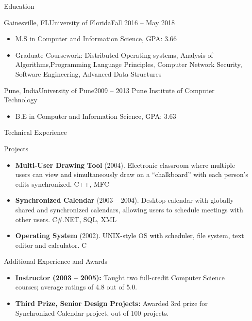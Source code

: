 \documentclass[]{mcdowellcv}
\begin{document}
	\begin{cvsection}{Education}
		\begin{cvsubsection}{Gainesville, FL}{University of Florida}{Fall 2016 -- May 2018}
			\begin{itemize}
				\item M.S in Computer and Information Science,  GPA: 3.66
				\item  Graduate Coursework: Distributed Operating systems, Analysis of Algorithms,Programming Language Principles, Computer Network
			Security, Software Engineering, Advanced Data Structures
			
		\end{itemize}
		\end{cvsubsection}
		\begin{cvsubsection}{Pune, India}{University of Pune}{2009 -- 2013}
			Pune Institute of Computer Technology	
		\begin{itemize}
				\item B.E in Computer and Information Science,  GPA: 3.63
		\end{itemize}
		\end{cvsubsection}

	\end{cvsection}
	
	\begin{cvsection}{Technical Experience}
		\begin{cvsubsection}{Projects}{}{}
			\begin{itemize}
				\item \textbf{Multi-User Drawing Tool} (2004). Electronic classroom where multiple users can view and simultaneously draw on a “chalkboard” with each person’s edits synchronized.  C++, MFC
				\item \textbf{Synchronized Calendar} (2003 – 2004). Desktop calendar with globally shared and synchronized calendars, allowing users to schedule meetings with other users.  C\#.NET, SQL, XML
				\item \textbf{Operating System} (2002).  UNIX-style OS with scheduler, file system, text editor and calculator. C
			\end{itemize}
		\end{cvsubsection}
	\end{cvsection}
	
	\begin{cvsection}{Additional Experience and Awards}
		\begin{cvsubsection}{}{}{}	
			\begin{itemize}
				\item \textbf{Instructor (2003 – 2005):} Taught two full-credit Computer Science courses; average ratings of 4.8 out of 5.0.
				\item \textbf{Third Prize, Senior Design Projects:} Awarded 3rd prize for Synchronized Calendar project, out of 100 projects.
			\end{itemize}
		\end{cvsubsection}
	\end{cvsection}
	
\end{document}
